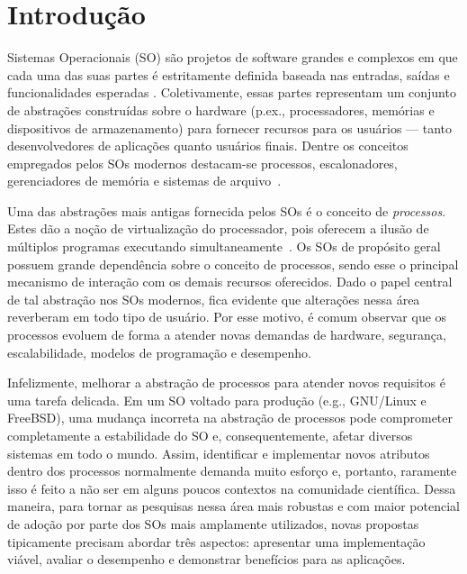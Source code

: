 \chapter{Introdução}
\label{cap:introducao}

Sistemas Operacionais (SO) são projetos de software grandes e
complexos em que cada uma das suas partes é estritamente definida baseada nas
entradas, saídas e funcionalidades esperadas \citep{silberschatz}.
Coletivamente, essas partes representam um conjunto de abstrações construídas
sobre o hardware (p.ex., processadores, memórias e dispositivos de
armazenamento) para fornecer recursos para os usuários --- tanto
desenvolvedores de aplicações quanto usuários finais. Dentre os conceitos
empregados pelos SOs modernos destacam-se processos, escalonadores,
gerenciadores de memória e sistemas de arquivo~\citep{tanenbaum}.

Uma das abstrações mais antigas fornecida pelos SOs é o conceito de
\textit{processos}. Estes dão a noção de virtualização do processador, pois
oferecem a ilusão de múltiplos programas executando
simultaneamente~\citep{love, tanenbaum}. Os SOs de propósito geral possuem
grande dependência sobre o conceito de processos, sendo esse o principal
mecanismo de interação com os demais recursos oferecidos. Dado o papel central
de tal abstração nos SOs modernos, fica evidente que alterações nessa área
reverberam em todo tipo de usuário. Por esse motivo, é comum observar que os
processos evoluem de forma a atender novas demandas de hardware, segurança,
escalabilidade, modelos de programação e desempenho.

Infelizmente, melhorar a abstração de processos para atender novos requisitos é
uma tarefa delicada. Em um SO voltado para produção (e.g., GNU/Linux e
FreeBSD), uma mudança incorreta na abstração de processos pode comprometer
completamente a estabilidade do SO e, consequentemente, afetar diversos sistemas em
todo o mundo. Assim, identificar e implementar novos atributos dentro dos
processos normalmente demanda muito esforço e, portanto, raramente isso é feito a não ser em alguns poucos contextos na comunidade científica. Dessa
maneira, para tornar as pesquisas nessa área mais robustas e com maior
potencial de adoção por parte dos SOs mais amplamente utilizados, novas propostas tipicamente
precisam abordar três aspectos: apresentar uma implementação viável,
avaliar o desempenho e demonstrar benefícios para as aplicações.

